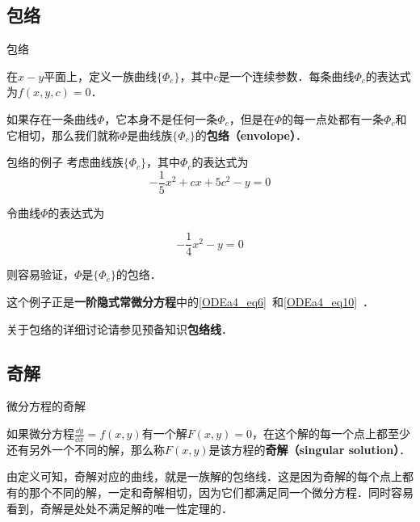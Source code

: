 

\subsection{包络}

\begin{definition}{包络}

在$x-y$平面上，定义一族曲线$\{\Phi_c\}$，其中$c$是一个连续参数．每条曲线$\Phi_c$的表达式为$f(x, y, c)=0$．

如果存在一条曲线$\Phi$，它本身不是任何一条$\Phi_c$，但是在$\Phi$的每一点处都有一条$\Phi_c$和它相切，那么我们就称$\Phi$是曲线族$\{\Phi_c\}$的\textbf{包络（envolope）}．

\end{definition}

\begin{example}{包络的例子}
考虑曲线族$\{\Phi_c\}$，其中$\Phi_c$的表达式为
\begin{equation}
-\frac{1}{5}x^2+cx+5c^2-y=0
\end{equation}

令曲线$\Phi$的表达式为

\begin{equation}
-\frac{1}{4}x^2-y=0
\end{equation}

则容易验证，$\Phi$是$\{\Phi_c\}$的包络．

这个例子正是\textbf{一阶隐式常微分方程}中的\autoref{ODEa4_eq6}~和\autoref{ODEa4_eq10}~．

\end{example}

关于包络的详细讨论请参见预备知识\textbf{包络线}．


\subsection{奇解}

\begin{definition}{微分方程的奇解}

如果微分方程$\frac{\dd y}{\dd x}=f(x, y)$有一个解$F(x, y)=0$，在这个解的每一个点上都至少还有另外一个不同的解，那么称$F(x, y)$是该方程的\textbf{奇解（singular solution）}．

\end{definition}

由定义可知，奇解对应的曲线，就是一族解的包络线．这是因为奇解的每个点上都有的那个不同的解，一定和奇解相切，因为它们都满足同一个微分方程．同时容易看到，奇解是处处不满足解的唯一性定理的．

